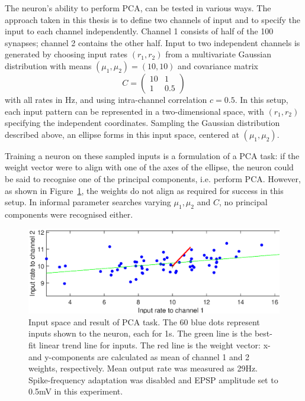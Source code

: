 \documentclass[a4paper,12pt]{report}
\theoremstyle{definition}
\begin{document}
The neuron's ability to perform PCA, can be tested in various ways. The approach taken in this thesis is to define two channels of input and to specify the input to each channel independently. Channel 1 consists of half of the 100 synapses; channel 2 contains the other half. Input to two independent channels is generated by choosing input rates $(r_1, r_2)$ from a multivariate Gaussian distribution with means $(\mu_1, \mu_2)=(10,10)$ and covariance matrix
$$
C =
\begin{pmatrix}
  10 & 1 \\
  1 & 0.5
 \end{pmatrix}
$$
with all rates in Hz, and using intra-channel correlation $c=0.5$. In this setup, each input pattern can be represented in a two-dimensional space, with $(r_1, r_2)$ specifying the independent coordinates. Sampling the Gaussian distribution described above, an ellipse forms in this input space, centered at $(\mu_1, \mu_2)$.

Training a neuron on these sampled inputs is a formulation of a PCA task: if the weight vector were to align with one of the axes of the ellipse, the neuron could be said to recognise one of the principal components, i.e. perform PCA. However, as shown in Figure~\ref{fig:exp10_pca}, the weights do not align as required for success in this setup. In informal parameter searches varying $\mu_1, \mu_2$ and $C$, no principal components were recognised either.

\begin{figure}[!htb]
    \centering
    \includegraphics[width=\textwidth]{figures/exp10_pca.eps}
    \caption{Input space and result of PCA task. The 60 blue dots represent inputs shown to the neuron, each for 1s. The green line is the best-fit linear trend line for inputs. The red line is the weight vector: x- and y-components are calculated as mean of channel 1 and 2 weights, respectively. Mean output rate was measured as 29Hz. Spike-frequency adaptation was disabled and EPSP amplitude set to 0.5mV in this experiment.}
    \label{fig:exp10_pca}
\end{figure}
\end{document}
